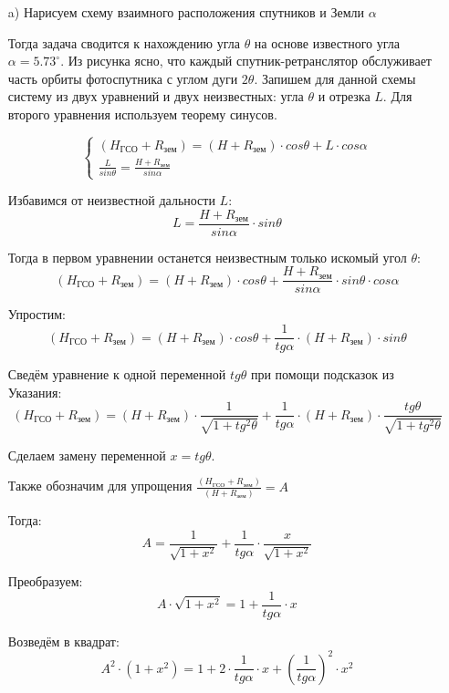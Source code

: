 \begin{enumerate}
    \item[a)] Нарисуем схему взаимного расположения спутников и Земли $\alpha$
 

    Тогда задача сводится к нахождению угла $\theta$ на основе известного угла \linebreak $\alpha=5.73^\circ$. 
    Из рисунка ясно, что каждый спутник-ретранслятор обслуживает часть орбиты фотоспутника с углом дуги $2\theta$.  
    Запишем для данной схемы систему из двух уравнений и двух неизвестных:
    угла $\theta$ и отрезка $L$. Для второго уравнения используем теорему синусов.
    
    $$\left\{
        \begin{array}{l}
        (H_\text{ГСО}+R_\text{зем})=(H+R_\text{зем})\cdot cos\theta +L\cdot cos\alpha\\
        \frac{L}{sin\theta}=\frac{H+R_\text{зем}}{sin\alpha}
        \end{array} \right.        
    $$
    
    Избавимся от неизвестной дальности $L$:
    $$L=\frac{H+R_\text{зем}}{sin\alpha} \cdot sin\theta$$

    Тогда в первом уравнении останется неизвестным только искомый угол $\theta$:
    $$(H_\text{ГСО}+R_\text{зем} )=(H+R_\text{зем} )\cdot cos\theta +\frac{H+R_\text{зем}}{sin\alpha} \cdot sin\theta \cdot  cos\alpha$$
    
    Упростим:
    $$(H_\text{ГСО}+R_\text{зем} )=(H+R_\text{зем} )\cdot cos\theta + \frac{1}{tg\alpha} \cdot (H+R_\text{зем} )\cdot sin\theta$$ 
    
    Сведём уравнение к одной переменной $tg\theta$ при помощи подсказок из Указания:
    $$(H_\text{ГСО}+R_\text{зем} )=(H+R_\text{зем} )\cdot  \frac{1}{\sqrt{1+tg^2 \theta}}+\frac{1}{tg\alpha} \cdot (H+R_\text{зем} )\cdot  \frac{tg \theta}{\sqrt{1+tg^2 \theta}}$$  
    
    Сделаем замену переменной  $x= tg\theta$. 

    Также обозначим для упрощения $\frac{(H_\text{ГСО}+R_\text{зем} )}{(H+R_\text{зем} )}=A$

    Тогда:
    $$A=\frac{1}{\sqrt{1+x^2}}+\frac{1}{tg\alpha} \cdot  \frac{x}{\sqrt{1+x^2}}$$

    Преобразуем:
    $$A\cdot \sqrt{1+x^2}=1+\frac{1}{tg\alpha} \cdot x$$

    Возведём в квадрат:
    $$A^2 \cdot (1+x^2 )=1+2\cdot  \frac{1}{tg\alpha} \cdot x+\left(\frac{1}{tg\alpha}\right)^2 \cdot x^2$$


\end{enumerate}
